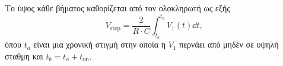 	Το ύψος κάθε βήματος καθορίζεται από τον ολοκληρωτή ως εξής
	\begin{equation*}
		V_{\mathrm{step}}=\frac{2}{R\cdot C}\int_{t_a}^{t_b}{V_1(t)\dd{t}},
	\end{equation*}
	όπου $t_a$ είναι μια χρονική στιγμή στην οποία η $V_1$ περνάει από μηδέν σε υψηλή σταθμη και $t_b=t_a+t_{\mathrm{on}}$.\par